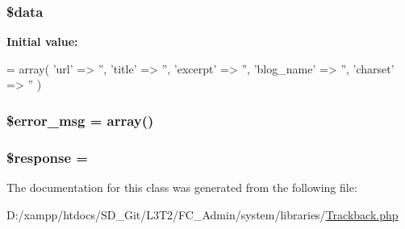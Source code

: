 \subsubsection[{\$data}]{\setlength{\rightskip}{0pt plus 5cm}\${\bf data}}\label{class_c_i___trackback_a6efc15b5a2314dd4b5aaa556a375c6d6}
{\bfseries Initial value\+:}
\begin{DoxyCode}
= array(
        \textcolor{stringliteral}{'url'} => \textcolor{stringliteral}{''},
        \textcolor{stringliteral}{'title'} => \textcolor{stringliteral}{''},
        \textcolor{stringliteral}{'excerpt'} => \textcolor{stringliteral}{''},
        \textcolor{stringliteral}{'blog\_name'} => \textcolor{stringliteral}{''},
        \textcolor{stringliteral}{'charset'} => \textcolor{stringliteral}{''}
    )
\end{DoxyCode}
\hypertarget{class_c_i___trackback_acf910733622c1fa671b9f755c69c2ec7}{}
\subsubsection[{\$error\+\_\+msg}]{\setlength{\rightskip}{0pt plus 5cm}\$error\+\_\+msg = array()}\label{class_c_i___trackback_acf910733622c1fa671b9f755c69c2ec7}
\hypertarget{class_c_i___trackback_af4b6fb1bbc77ccc05f10da3b16935b99}{}
\subsubsection[{\$response}]{\setlength{\rightskip}{0pt plus 5cm}\$response = \textquotesingle{}\textquotesingle{}}\label{class_c_i___trackback_af4b6fb1bbc77ccc05f10da3b16935b99}


The documentation for this class was generated from the following file\+:\begin{DoxyCompactItemize}
\item 
D\+:/xampp/htdocs/\+S\+D\+\_\+\+Git/\+L3\+T2/\+F\+C\+\_\+\+Admin/system/libraries/\hyperlink{_trackback_8php}{Trackback.\+php}\end{DoxyCompactItemize}
